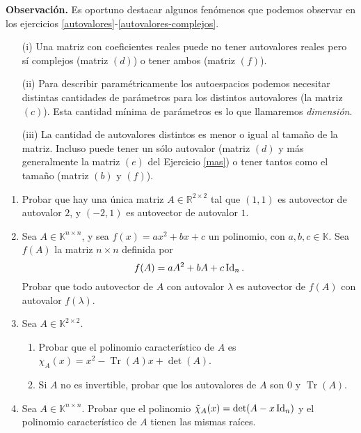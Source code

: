 \textbf{Observación.} Es oportuno destacar algunos fenómenos que podemos observar en los ejercicios \ref{autovalores}-\ref{autovalores-complejos}.
\begin{itemize}
 \item[(i)] Una matriz con coeficientes reales puede no tener autovalores reales pero sí complejos (matriz $(d)$) o tener ambos (matriz $(f)$).
 \item[(ii)] Para describir paramétricamente los autoespacios podemos necesitar distintas cantidades de parámetros para los distintos autovalores (la matriz $(c)$). Esta cantidad mínima de parámetros es lo que llamaremos {\it dimensión}.
 \item[(iii)] La cantidad de autovalores distintos es menor o igual al tama\~no de la matriz. Incluso puede tener un sólo autovalor (matriz $(d)$ y más generalmente la matriz $(e)$ del Ejercicio \ref{mas}) o tener tantos como el tama\~no (matriz $(b)$ y $(f)$).
\end{itemize}

\begin{enumerate}[resume,topsep=6pt,itemsep=.4cm]

\item Probar que hay una única matriz $A\in\mathbb{R}^{2\times 2}$ tal que $(1,1)$ es autovector de autovalor $2$, y $(-2,1)$ es autovector de autovalor $1$.
    

\item Sea $A\in\mathbb{K}^{n\times n}$, y sea $f(x) = ax^2+bx+c$ un polinomio, con $a,b,c\in\mathbb{K}$. Sea $f(A)$ la matriz $n \times n$ definida por
$$f(A) = a A^2+bA+c\operatorname{Id}_n.$$
Probar que todo autovector de $A$ con autovalor $\lambda$ es autovector de $f(A)$ con autovalor $f(\lambda)$.

    
\item Sea $A\in\mathbb{K}^{2\times 2}$.

    \begin{enumerate}     
        \item Probar que el polinomio característico de $A$ es \ $\chi_A(x) = x^2-\operatorname{Tr}(A)x+\det(A)$.
        \item Si $A$ no es invertible, probar que los autovalores de  $A$ son $0$ y $\operatorname{Tr}(A)$.
    \end{enumerate}

    \item Sea $A\in\mathbb{K}^{n\times n}$. Probar que el polinomio $\tilde\chi_A(x)=\det(A-x\operatorname{Id}_n)$ y el polinomio característico de $A$ tienen las mismas raíces.

\end{enumerate}

